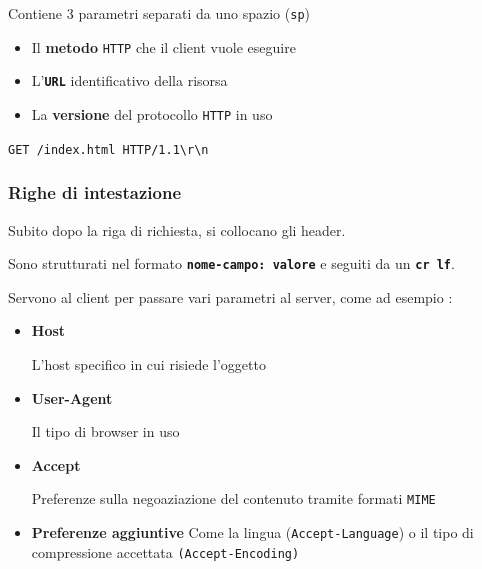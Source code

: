 Contiene 3 parametri separati da uno spazio (\texttt{sp})

    \begin{itemize}
        \item Il \textbf{metodo} \texttt{HTTP} che il client vuole eseguire
        \item L'\textbf{\texttt{URL}} identificativo della risorsa
        \item La \textbf{versione} del protocollo \texttt{HTTP} in uso
    \end{itemize}

    \begin{center}
        \begin{tcolorbox}[title=Esempio: Riga di richiesta]
            \texttt{GET /index.html HTTP/1.1\textbackslash r\textbackslash n}
        \end{tcolorbox}
    \end{center}

\subsubsection{Righe di intestazione}
Subito dopo la riga di richiesta, si collocano gli header.

Sono  strutturati nel formato \textbf{\texttt{nome-campo: valore}} e seguiti da un \textbf{\texttt{cr lf}}.

Servono al client per passare vari parametri al server, come ad esempio : 

    \begin{itemize}
        \item \textbf{Host} 
        
        L'host specifico in cui risiede l'oggetto
        \item \textbf{User-Agent} 
        
        Il tipo di browser in uso
        \item \textbf{Accept}
        
        Preferenze sulla negoaziazione del contenuto tramite formati \texttt{MIME}
        \item \textbf{Preferenze aggiuntive}
        Come la lingua (\texttt{Accept-Language}) o il tipo di compressione accettata \texttt{(Accept-Encoding)}
    \end{itemize}

